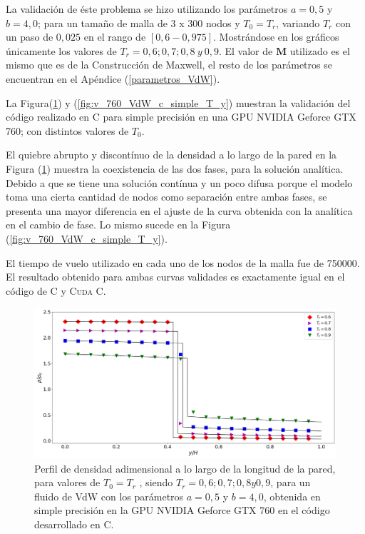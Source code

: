 La validación de éste problema se hizo utilizando los parámetros $a =0,5$ y $b = 4,0$; para un tamaño de malla de 3 x 300 nodos y $T_0 = T_r$, variando $T_r$ con un paso de $0,025$ en el rango de $[0,6 - 0,975]$. Mostrándose en los gráficos únicamente los valores de $T_r = 0,6 ; 0,7 ; 0,8 \> y \> 0,9$.    El valor de $\mathbf{M}$ utilizado es el mismo que es de la Construcción de Maxwell, el resto de los parámetros se encuentran en el Apéndice (\ref{parametros_VdW}).

La Figura(\ref{fig:v_760_VdW_c_simple_rho_y}) y (\ref{fig:v_760_VdW_c_simple_T_y})  muestran la validación del código realizado en \textsc{C} para simple precisión en una GPU NVIDIA Geforce GTX 760; con distintos valores de $T_0$. 

El quiebre abrupto y discontínuo de la densidad a lo largo de la pared en la Figura (\ref{fig:v_760_VdW_c_simple_rho_y}) muestra la coexistencia de las dos fases, para la solución analítica. Debido a que se tiene una solución contínua y un poco difusa porque el modelo toma una cierta cantidad de nodos como separación entre ambas fases, se presenta una mayor diferencia en el ajuste de la curva obtenida con la analítica en el cambio de fase. Lo mismo sucede en la Figura (\ref{fig:v_760_VdW_c_simple_T_y}).

El tiempo de vuelo utilizado en cada uno de los nodos de la malla fue de 750000. 
El resultado obtenido para ambas curvas validades es exactamente igual en el código de \textsc{C} y \textsc{Cuda C}.

\begin{figure}[htbp]
	\centering
	\includegraphics[width=\textwidth]{figs/cap4/v_760_VdW_c_simple_rho_y}
	\caption{Perfil de densidad adimensional a lo largo de la longitud de la pared, para valores de $T_0 = T_r$ , siendo $T_r = 0,6 ; 0,7 ; 0,8 y 0,9$, para un fluido de VdW con los parámetros $a = 0,5 $ y $b = 4,0 $, obtenida en simple precisión en la GPU NVIDIA Geforce GTX 760 en el código desarrollado en \textsc{C}.}
	\label{fig:v_760_VdW_c_simple_rho_y}	
\end{figure}

